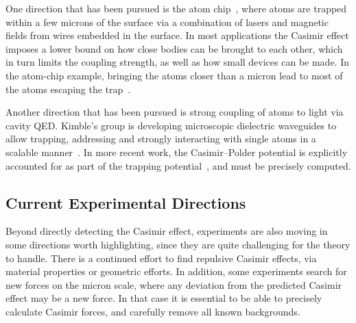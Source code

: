 One direction that has been pursued is the atom chip~\citep{Folman2000,Schneider2003,Salem2010},
where atoms are trapped within a few microns of the surface via a combination of lasers and magnetic fields from wires embedded in
the surface.  %
In most applications the Casimir effect imposes a lower bound on how close bodies can be brought 
to each other, which in turn limits the coupling strength, as well as how small devices can be made.
In the atom-chip example, bringing the atoms closer than a micron lead to most of the atoms escaping the 
trap~\citep{Lin2004}.

Another direction that has been pursued is strong coupling of atoms to light via cavity QED.  
Kimble's group is developing microscopic dielectric waveguides to allow trapping, addressing and strongly interacting with  
single atoms in a scalable manner~\citep{Alton2011, Hung2013, Goban2014}.  In more recent work,
the Casimir--Polder potential is explicitly accounted for as part of the trapping potential~\citep{Goban2014},
and must be precisely computed.

\subsection{Current Experimental Directions}

Beyond directly detecting the Casimir effect, experiments are also moving in some directions worth highlighting,
since they are quite challenging for the theory to handle.
There is a continued effort to find repulsive Casimir effects, via material properties or geometric efforts.
In addition, some experiments search for new forces on the micron scale, where any deviation from the predicted
Casimir effect may be a new force.  In that case it is essential to be able to precisely calculate
Casimir forces, and carefully remove all known backgrounds. 


